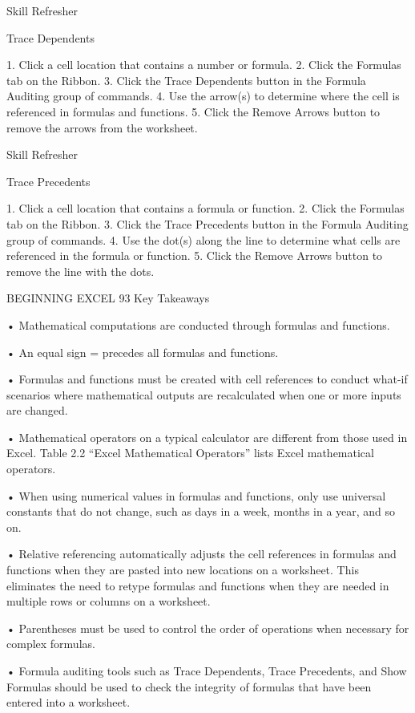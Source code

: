 Skill Refresher


Trace Dependents

1. Click a cell location that contains a number or formula.
2. Click the Formulas tab on the Ribbon.
3. Click the Trace Dependents button in the Formula Auditing group of commands.
4. Use the arrow(s) to determine where the cell is referenced in formulas and functions.
5. Click the Remove Arrows button to remove the arrows from the worksheet.




Skill Refresher


Trace Precedents

1. Click a cell location that contains a formula or function.
2. Click the Formulas tab on the Ribbon.
3. Click the Trace Precedents button in the Formula Auditing group of commands.
4. Use the dot(s) along the line to determine what cells are referenced in the formula or function.
5. Click the Remove Arrows button to remove the line with the dots.




BEGINNING EXCEL 93
Key Takeaways


• Mathematical computations are conducted through formulas and functions.

• An equal sign = precedes all formulas and functions.

• Formulas and functions must be created with cell references to conduct what-if scenarios where
mathematical outputs are recalculated when one or more inputs are changed.

• Mathematical operators on a typical calculator are different from those used in Excel. Table 2.2 “Excel
Mathematical Operators” lists Excel mathematical operators.

• When using numerical values in formulas and functions, only use universal constants that do not change,
such as days in a week, months in a year, and so on.

• Relative referencing automatically adjusts the cell references in formulas and functions when they are
pasted into new locations on a worksheet. This eliminates the need to retype formulas and functions when
they are needed in multiple rows or columns on a worksheet.

• Parentheses must be used to control the order of operations when necessary for complex formulas.

• Formula auditing tools such as Trace Dependents, Trace Precedents, and Show Formulas should be used to
check the integrity of formulas that have been entered into a worksheet.



